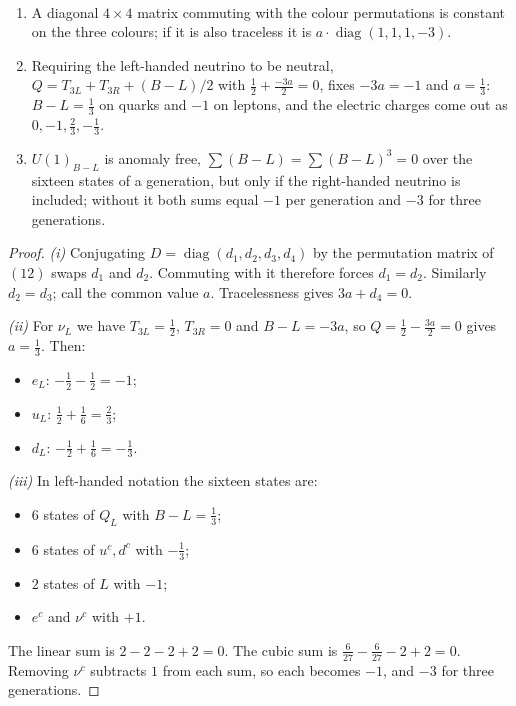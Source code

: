 \begin{theorem}[$B-L$ is unique]\label{thm:bl}\ver\
\begin{enumerate}[label=(\roman*)]
\item A diagonal $4\times4$ matrix commuting with the colour permutations is constant on the three colours; if it is also traceless it is $a\cdot\operatorname{diag}(1,1,1,-3)$.
\item Requiring the left-handed neutrino to be neutral, $Q=T_{3L}+T_{3R}+(B-L)/2$ with $\frac12+\frac{-3a}2=0$, fixes $-3a=-1$ and $a=\frac13$: $B-L=\frac13$ on quarks and $-1$ on leptons, and the electric charges come out as $0,-1,\frac23,-\frac13$.
\item $U(1)_{B-L}$ is anomaly free, $\sum(B-L)=\sum(B-L)^3=0$ over the sixteen states of a generation, but only if the right-handed neutrino is included; without it both sums equal $-1$ per generation and $-3$ for three generations.
\end{enumerate}
\end{theorem}
\begin{proof}
\emph{(i)} Conjugating $D=\operatorname{diag}(d_1,d_2,d_3,d_4)$ by the permutation matrix of $(12)$ swaps $d_1$ and $d_2$. Commuting with it therefore forces $d_1=d_2$. Similarly $d_2=d_3$; call the common value $a$. Tracelessness gives $3a+d_4=0$.

\emph{(ii)} For $\nu_L$ we have $T_{3L}=\frac12$, $T_{3R}=0$ and $B-L=-3a$, so $Q=\frac12-\frac{3a}2=0$ gives $a=\frac13$. Then:
\begin{itemize}[nosep]
\item $e_L$: $-\frac12-\frac12=-1$;
\item $u_L$: $\frac12+\frac16=\frac23$;
\item $d_L$: $-\frac12+\frac16=-\frac13$.
\end{itemize}

\emph{(iii)} In left-handed notation the sixteen states are:
\begin{itemize}[nosep]
\item $6$ states of $Q_L$ with $B-L=\frac13$;
\item $6$ states of $u^c,d^c$ with $-\frac13$;
\item $2$ states of $L$ with $-1$;
\item $e^c$ and $\nu^c$ with $+1$.
\end{itemize}
The linear sum is $2-2-2+2=0$. The cubic sum is $\frac6{27}-\frac6{27}-2+2=0$. Removing $\nu^c$ subtracts $1$ from each sum, so each becomes $-1$, and $-3$ for three generations.
\end{proof}


